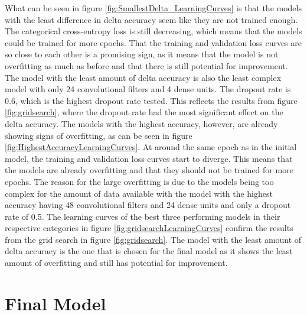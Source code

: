 What can be seen in figure \ref{fig:SmallestDelta_LearningCurves} is that the models with the least difference in delta accuracy seem like they are not trained enough.
The categorical cross-entropy loss is still decreasing, which means that the models could be trained for more epochs.
That the training and validation loss curves are so close to each other is a promising sign, as it means that the model is not overfitting as much as before and that there is still potential for improvement.
The model with the least amount of delta accuracy is also the least complex model with only 24 convolutional filters and 4 dense units.
The dropout rate is 0.6, which is the highest dropout rate tested.
This reflects the results from figure \ref{fig:gridsearch}, where the dropout rate had the most significant effect on the delta accuracy. \newline
The models with the highest accuracy, however, are already showing signs of overfitting, as can be seen in figure \ref{fig:HighestAccuracyLearningCurves}.
At around the same epoch as in the initial model, the training and validation loss curves start to diverge.
This means that the models are already overfitting and that they should not be trained for more epochs.
The reason for the large overfitting is due to the models being too complex for the amount of data available with the model with the highest accuracy having 48 convolutional filters and 24 dense units and only a dropout rate of 0.5.
The learning curves of the best three performing models in their respective categories in figure \ref{fig:gridsearchLearningCurves} confirm the results from the grid search in figure \ref{fig:gridsearch}.
The model with the least amount of delta accuracy is the one that is chosen for the final model as it shows the least amount of overfitting and still has potential for improvement.

\section{Final Model}
\label{sec:finalModel}

